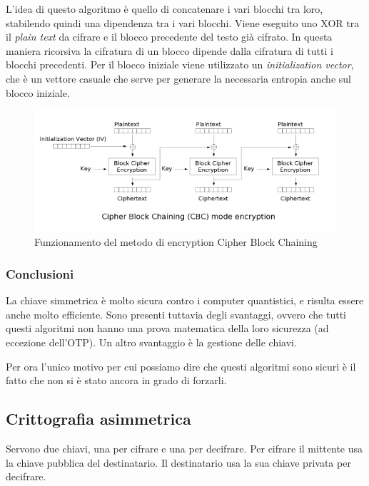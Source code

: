 L'idea di questo algoritmo è quello di concatenare i vari blocchi tra loro,
stabilendo quindi una dipendenza tra i vari blocchi. Viene eseguito uno XOR tra
il \textit{plain text} da cifrare e il blocco precedente del testo già cifrato.
In questa maniera ricorsiva la cifratura di un blocco dipende dalla cifratura di
tutti i blocchi precedenti. Per il blocco iniziale viene utilizzato un
\textit{initialization vector}, che è un vettore casuale che serve per generare
la necessaria entropia anche sul blocco iniziale.

\begin{figure}[H]
\centering
\includegraphics[scale=0.65]{res/img/cbc.png}
\caption{Funzionamento del metodo di encryption Cipher Block Chaining}
\label{fig:password:cbc}
\end{figure}

\subsubsection{Conclusioni}

La chiave simmetrica è molto sicura contro i computer quantistici, e risulta
essere anche molto efficiente. Sono presenti tuttavia degli svantaggi, ovvero
che tutti questi algoritmi non hanno una prova matematica della loro
sicurezza (ad eccezione dell'OTP). Un altro svantaggio è la gestione delle
chiavi.

Per ora l'unico motivo per cui possiamo dire che questi algoritmi sono sicuri è
il fatto che non si è stato ancora in grado di forzarli.

\subsection{Crittografia asimmetrica}

Servono due chiavi, una per cifrare e una per decifrare. Per cifrare il
mittente usa la chiave pubblica del destinatario. Il destinatario usa la sua
chiave privata per decifrare.

